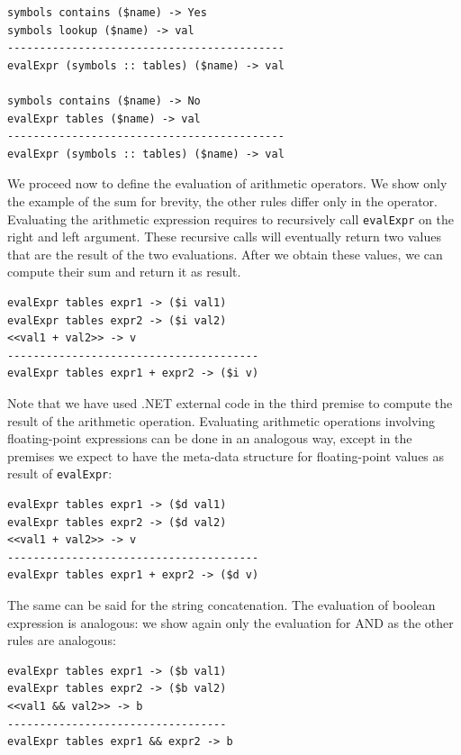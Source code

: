 \begin{lstlisting}
symbols contains ($name) -> Yes
symbols lookup ($name) -> val
-------------------------------------------
evalExpr (symbols :: tables) ($name) -> val

symbols contains ($name) -> No
evalExpr tables ($name) -> val
-------------------------------------------
evalExpr (symbols :: tables) ($name) -> val

\end{lstlisting}

We proceed now to define the evaluation of arithmetic operators. We show only the example of the sum for brevity, the other rules differ only in the operator. Evaluating the arithmetic expression requires to recursively call \texttt{evalExpr} on the right and left argument. These recursive calls will eventually return two values that are the result of the two evaluations. After we obtain these values, we can compute their sum and return it as result.

\begin{lstlisting}
evalExpr tables expr1 -> ($i val1)
evalExpr tables expr2 -> ($i val2)
<<val1 + val2>> -> v
---------------------------------------
evalExpr tables expr1 + expr2 -> ($i v)
\end{lstlisting}

\noindent
Note that we have used .NET external code in the third premise to compute the result of the arithmetic operation. Evaluating arithmetic operations involving floating-point expressions can be done in an analogous way, except in the premises we expect to have the meta-data structure for floating-point values as result of \texttt{evalExpr}:

\begin{lstlisting}
evalExpr tables expr1 -> ($d val1)
evalExpr tables expr2 -> ($d val2)
<<val1 + val2>> -> v
---------------------------------------
evalExpr tables expr1 + expr2 -> ($d v)
\end{lstlisting}

\noindent
The same can be said for the string concatenation.
The evaluation of boolean expression is analogous: we show again only the evaluation for AND as the other rules are analogous:

\begin{lstlisting}
evalExpr tables expr1 -> ($b val1)
evalExpr tables expr2 -> ($b val2)
<<val1 && val2>> -> b
----------------------------------
evalExpr tables expr1 && expr2 -> b
\end{lstlisting}

